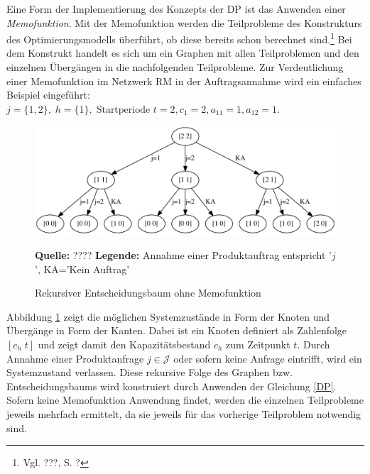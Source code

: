 Eine Form der Implementierung des Konzepts der DP ist das Anwenden einer \textit{Memofunktion}. Mit der Memofunktion werden die Teilprobleme des Konstrukturs des Optimierungsmodells überführt, ob diese bereits schon berechnet sind.\footnote{Vgl. ???, S. ?} Bei dem Konstrukt handelt es sich um ein Graphen mit allen Teilproblemen und den einzelnen Übergängen in die nachfolgenden Teilprobleme. Zur Verdeutlichung einer Memofunktion im Netzwerk RM in der Auftragsannahme wird ein einfaches Beispiel eingeführt: $j = \{1, 2\}, \; h = \{1\}, \; \text{Startperiode } t=2, c_{1}=2, a_{11}=1, a_{12}=1.$

\begin{figure}[h!]
  \begin{center}
    \includegraphics[width=140mm]{Bilder/Einfach.pdf}
    \caption{Rekursiver Entscheidungsbaum ohne Memofunktion}  \label{Einfach}
        {\footnotesize \textbf{Quelle:} ????} 
    {\footnotesize \textbf{Legende:} Annahme einer Produktauftrag entspricht '$j$', KA='Kein Auftrag'} 
  \end{center}
\end{figure}

Abbildung \ref{Einfach} zeigt die möglichen Systemzustände in Form der Knoten und Übergänge in Form der Kanten. Dabei ist ein Knoten definiert als Zahlenfolge $[c_h\; t]$ und zeigt damit den Kapazitätsbestand $c_h$ zum Zeitpunkt $t$. Durch Annahme einer Produktanfrage $j\in\mathcal{J}$ oder sofern keine Anfrage eintrifft, wird ein Systemzustand verlassen. Diese rekursive Folge des Graphen bzw. Entscheidungsbaums wird konstruiert durch Anwenden der Gleichung \eqref{DP}. Sofern keine Memofunktion Anwendung findet, werden die einzelnen Teilprobleme jeweils mehrfach ermittelt, da sie jeweils für das vorherige Teilproblem notwendig sind.

